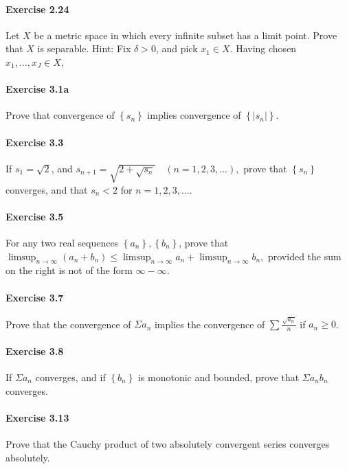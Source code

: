 \documentclass{article}
\begin{document}
\paragraph{Exercise 2.24} Let $X$ be a metric space in which every infinite subset has a limit point. Prove that $X$ is separable. Hint: Fix $\delta>0$, and pick $x_{1} \in X$. Having chosen $x_{1}, \ldots, x_{J} \in X$,

\paragraph{Exercise 3.1a} Prove that convergence of $\left\{s_{n}\right\}$ implies convergence of $\left\{\left|s_{n}\right|\right\}$.

\paragraph{Exercise 3.3} If $s_{1}=\sqrt{2}$, and $s_{n+1}=\sqrt{2+\sqrt{s_{n}}} \quad(n=1,2,3, \ldots),$ prove that $\left\{s_{n}\right\}$ converges, and that $s_{n}<2$ for $n=1,2,3, \ldots$.

\paragraph{Exercise 3.5} For any two real sequences $\left\{a_{n}\right\},\left\{b_{n}\right\}$, prove that $\limsup _{n \rightarrow \infty}\left(a_{n}+b_{n}\right) \leq \limsup _{n \rightarrow \infty} a_{n}+\limsup _{n \rightarrow \infty} b_{n},$ provided the sum on the right is not of the form $\infty-\infty$.

\paragraph{Exercise 3.7} Prove that the convergence of $\Sigma a_{n}$ implies the convergence of $\sum \frac{\sqrt{a_{n}}}{n}$ if $a_n\geq 0$.

\paragraph{Exercise 3.8} If $\Sigma a_{n}$ converges, and if $\left\{b_{n}\right\}$ is monotonic and bounded, prove that $\Sigma a_{n} b_{n}$ converges.

\paragraph{Exercise 3.13} Prove that the Cauchy product of two absolutely convergent series converges absolutely.
\end{document}

